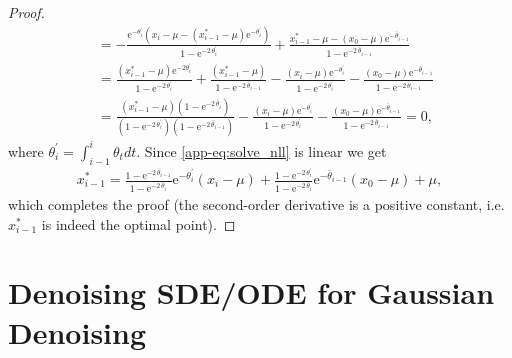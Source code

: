 \documentclass{article}
\newcommand{\expp}{\mathrm{e}}
\theoremstyle{plain}
\theoremstyle{definition}
\theoremstyle{remark}
\begin{document}
\begin{proof}
\begin{equation}
\begin{split}
     & = - \frac{\expp^{-{\theta}_i^{'}} ({x}_i - \mu - ({x}_{i-1}^{*} - \mu)\expp^{-{\theta}_i^{'}})}{1 - \expp^{-2 \, {\theta}_i^{'}}} + \frac{{x}_{i-1}^{*} - \mu - ({x}_0 - \mu)\expp^{-\bar{\theta}_{i-1}}}{1 - \expp^{-2 \, \bar{\theta}_{i-1}}} \\[.6em]
     & = \frac{({x}_{i-1}^{*} - \mu)\expp^{-2{\theta}_i^{'}}}{1 - \expp^{-2 \, {\theta}_i^{'}}} + \frac{({x}_{i-1}^{*} - \mu)}{1 - \expp^{-2 \, \bar{\theta}_{i-1}}} - \frac{({x}_{i} - \mu)\expp^{-{\theta}_i^{'}}}{1 - \expp^{-2 \, {\theta}_i^{'}}} - \frac{({x}_{0} - \mu)\expp^{-\bar{\theta}_{i-1}}}{1 - \expp^{-2 \, \bar{\theta}_{i-1}}} \\[.6em]
     & = \frac{({x}_{i-1}^{*} - \mu)(1 - \expp^{-2 \, \bar{\theta}_{i}})}{(1 - \expp^{-2 \, {\theta}_i^{'}})(1 - \expp^{-2 \, \bar{\theta}_{i-1}})} - \frac{({x}_{i} - \mu)\expp^{-{\theta}_i^{'}}}{1 - \expp^{-2 \, {\theta}_i^{'}}} - \frac{({x}_{0} - \mu)\expp^{-\bar{\theta}_{i-1}}}{1 - \expp^{-2 \, \bar{\theta}_{i-1}}} = 0,
    \label{app-eq:solve_nll}
\end{split}
\end{equation}
where $\theta_i^{'} = \int_{i-1}^i \theta_t dt$. Since \eqref{app-eq:solve_nll} is linear we get
\begin{equation}
    \begin{split}
        {x}_{i-1}^{*} = \frac{1 - \expp^{-2 \, \bar{\theta}_{i-1}}}{1 - \expp^{-2 \, \bar{\theta}_i}} \expp^{-\theta_i^{'}} ({x}_i - \mu) + \frac{1 - \expp^{-2 \, \theta_i^{'}}}{1 - \expp^{-2 \, \bar{\theta}_i}} \expp^{-\bar{\theta}_{i-1}} ({x}_0 - \mu) + \mu,
    \end{split}
    \end{equation}
which completes the proof (the second-order derivative is a positive constant, i.e. ${x}_{i-1}^{*}$ is indeed the optimal point).
\end{proof}



\section{Denoising SDE/ODE for Gaussian Denoising}
\label{app-sec:denoising_sde}
\end{document}
